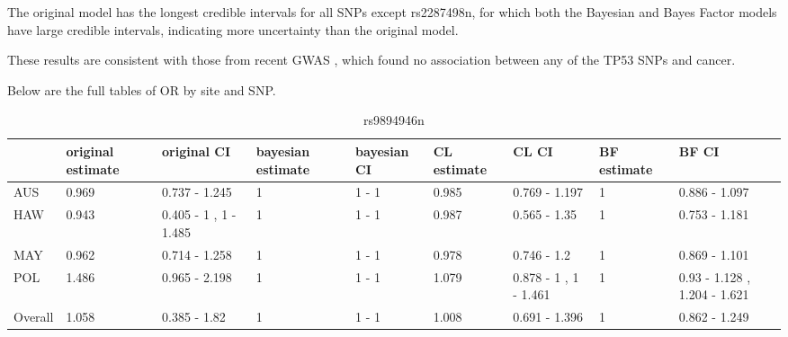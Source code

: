 \documentclass[AMA,STIX1COL]{WileyNJD-v2}\usepackage[]{graphicx}\usepackage[]{color}
\begin{document}
The original model has the longest credible intervals for all SNPs except rs2287498n, 
for which both the Bayesian and Bayes Factor models have large credible intervals, indicating more uncertainty than the original model.

These results are consistent with those from recent GWAS \cite{phelan2017identification}, which found no association between any of the TP53 SNPs and cancer.

Below are the full tables of OR by site and SNP.

\begin{table}

\caption{\label{tab:unnamed-chunk-39}rs9894946n}
\centering
\begin{tabular}[t]{l|l|l|l|l|l|l|l|l}
\hline
  & original estimate & original CI & bayesian estimate & bayesian CI & CL estimate & CL CI & BF estimate & BF CI\\
\hline
AUS & 0.969 & 0.737 - 1.245 & 1 & 1 - 1 & 0.985 & 0.769 - 1.197 & 1 & 0.886 - 1.097\\
\hline
HAW & 0.943 & 0.405 - 1 ,  1 - 1.485 & 1 & 1 - 1 & 0.987 & 0.565 - 1.35 & 1 & 0.753 - 1.181\\
\hline
MAY & 0.962 & 0.714 - 1.258 & 1 & 1 - 1 & 0.978 & 0.746 - 1.2 & 1 & 0.869 - 1.101\\
\hline
POL & 1.486 & 0.965 - 2.198 & 1 & 1 - 1 & 1.079 & 0.878 - 1 ,  1 - 1.461 & 1 & 0.93 - 1.128 ,  1.204 - 1.621\\
\hline
Overall & 1.058 & 0.385 - 1.82 & 1 & 1 - 1 & 1.008 & 0.691 - 1.396 & 1 & 0.862 - 1.249\\
\hline
\end{tabular}
\end{table}
\end{document}
